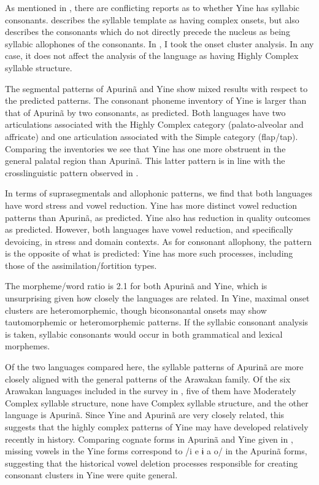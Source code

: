   As mentioned in , there are conflicting reports as to whether Yine has syllabic consonants. \citet{Matteson1965} describes the syllable template as having complex onsets, but also describes the consonants which do not directly precede the nucleus as being syllabic allophones of the consonants. In , I took the onset cluster analysis. In any case, it does not affect the analysis of the language as having Highly Complex syllable structure.

  The segmental patterns of Apurinã and Yine show mixed results with respect to the predicted patterns. The consonant phoneme inventory of Yine is larger than that of Apurinã by two consonants, as predicted. Both languages have two articulations associated with the Highly Complex category (palato-alveolar and affricate) and one articulation associated with the Simple category (flap/tap). Comparing the inventories we see that Yine has one more obstruent in the general palatal region than Apurinã. This latter pattern is in line with the crosslinguistic pattern observed in .

  In terms of suprasegmentals and allophonic patterns, we find that both languages have word stress and vowel reduction. Yine has more distinct vowel reduction patterns than Apurinã, as predicted. Yine also has reduction in quality outcomes as predicted. However, both languages have vowel reduction, and specifically devoicing, in stress and domain contexts. As for consonant allophony, the pattern is the opposite of what is predicted: Yine has more such processes, including those of the assimilation/fortition types.

  The morpheme/word ratio is 2.1 for both Apurinã and Yine, which is unsurprising given how closely the languages are related. In Yine, maximal onset clusters are heteromorphemic, though biconsonantal onsets may show tautomorphemic or heteromorphemic patterns. If the syllabic consonant analysis is taken, syllabic consonants would occur in both grammatical and lexical morphemes.

  Of the two languages compared here, the syllable patterns of Apurinã are more closely aligned with the general patterns of the Arawakan family. Of the six Arawakan languages included in the survey in \citet{Maddieson2013a}, five of them have Moderately Complex syllable structure, none have Complex syllable structure, and the other language is Apurinã. Since Yine and Apurinã are very closely related, this suggests that the highly complex patterns of Yine may have developed relatively recently in history. Comparing cognate forms in Apurinã and Yine given in \citet[88--89]{Facundes2002}, missing vowels in the Yine forms correspond to /i e ɨ a o/ in the Apurinã forms, suggesting that the historical vowel deletion processes responsible for creating consonant clusters in Yine were quite general.

